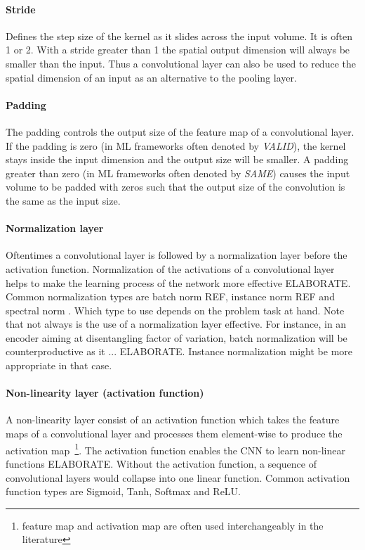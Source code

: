 \documentclass[12pt,a4paper]{article}
\begin{document}
\paragraph{Stride                   } Defines the step size of the kernel as it slides across the input volume. It is often 1 or 2. With a stride greater than 1 the spatial output dimension will always be smaller than the input. Thus a convolutional layer can also be used to reduce the spatial dimension of an input as an alternative to the pooling layer.

\paragraph{Padding					} The padding controls the output size of the feature map of a convolutional layer. If the padding is zero (in ML frameworks often denoted by \textit{VALID}), the kernel stays inside the input dimension and the output size will be smaller. A padding greater than zero (in ML frameworks often denoted by \textit{SAME}) causes the input volume to be padded with zeros such that the output size of the convolution is the same as the input size.

\paragraph{Normalization layer      } Oftentimes a convolutional layer is followed by a normalization layer before the activation function. Normalization of the activations of a convolutional layer helps to make the learning process of the network more effective ELABORATE. Common normalization types are batch norm REF, instance norm REF and spectral norm \cite{SNGAN}. Which type to use depends on the problem task at hand. Note that not always is the use of a normalization layer effective. For instance, in an encoder aiming at disentangling factor of variation, batch normalization will be counterproductive as it ... ELABORATE. Instance normalization might be more appropriate in that case.

\paragraph{Non-linearity layer (activation function)} A non-linearity layer consist of an activation function which takes the feature maps of a convolutional layer and processes them element-wise to produce the activation map~\footnote{feature map and activation map are often used interchangeably in the literature}. The activation function enables the CNN to learn non-linear functions ELABORATE. Without the activation function, a sequence of convolutional layers would collapse into one linear function. Common activation function types are Sigmoid, Tanh, Softmax and ReLU. 
\end{document}
